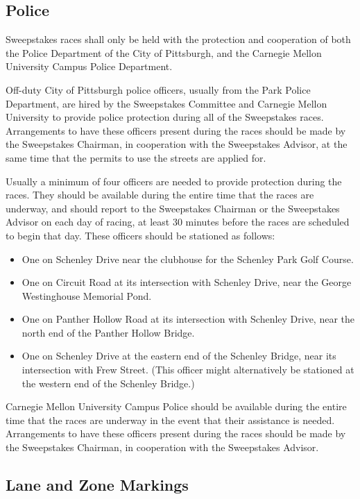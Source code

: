 \documentclass[openany]{book}
\begin{document}
\subsection{Police}

Sweepstakes races shall only be held with the protection and cooperation of both the Police Department of the City of Pittsburgh, and the Carnegie Mellon University Campus Police Department.

Off-duty City of Pittsburgh police officers, usually from the Park Police Department, are hired by the Sweepstakes Committee and Carnegie Mellon University to provide police protection during all of the Sweepstakes races. Arrangements to have these officers present during the races should be made by the Sweepstakes Chairman, in cooperation with the Sweepstakes Advisor, at the same time that the permits to use the streets are applied for.

Usually a minimum of four officers are needed to provide protection during the races. They should be available during the entire time that the races are underway, and should report to the Sweepstakes Chairman or the Sweepstakes Advisor on each day of racing, at least 30 minutes before the races are scheduled to begin that day. These officers should be stationed as follows:
\begin{itemize}
	\item One on Schenley Drive near the clubhouse for the Schenley Park Golf Course.
	\item One on Circuit Road at its intersection with Schenley Drive, near the George Westinghouse Memorial Pond.
	\item One on Panther Hollow Road at its intersection with Schenley Drive, near the north end of the Panther Hollow Bridge.
	\item One on Schenley Drive at the eastern end of the Schenley Bridge, near its intersection with Frew Street. (This officer might alternatively be stationed at the western end of the Schenley Bridge.)
\end{itemize}

Carnegie Mellon University Campus Police should be available during the entire time that the races are underway in the event that their assistance is needed. Arrangements to have these officers present during the races should be made by the Sweepstakes Chairman, in cooperation with the Sweepstakes Advisor.

\subsection{Lane and Zone Markings}
\end{document}
